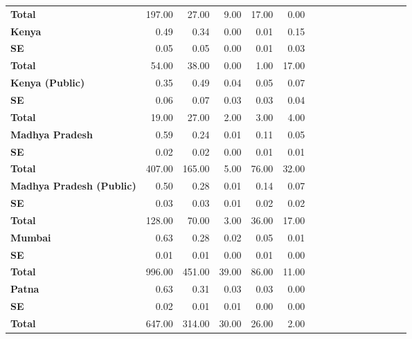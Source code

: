 \begin{tabular}{@{\extracolsep{5pt}}lrrrrrrrrrrrrrrr}
{\bf Total} & 197.00\phantom{***} & 27.00\phantom{***} & 9.00\phantom{***} & 17.00\phantom{***} & 0.00\phantom{***} \\
{\bf Kenya} & 0.49\phantom{***} & 0.34\phantom{***} & 0.00\phantom{***} & 0.01\phantom{***} & 0.15\phantom{***} \\
{\bf SE} & 0.05\phantom{***} & 0.05\phantom{***} & 0.00\phantom{***} & 0.01\phantom{***} & 0.03\phantom{***} \\
{\bf Total} & 54.00\phantom{***} & 38.00\phantom{***} & 0.00\phantom{***} & 1.00\phantom{***} & 17.00\phantom{***} \\
{\bf Kenya (Public)} & 0.35\phantom{***} & 0.49\phantom{***} & 0.04\phantom{***} & 0.05\phantom{***} & 0.07\phantom{***} \\
{\bf SE} & 0.06\phantom{***} & 0.07\phantom{***} & 0.03\phantom{***} & 0.03\phantom{***} & 0.04\phantom{***} \\
{\bf Total} & 19.00\phantom{***} & 27.00\phantom{***} & 2.00\phantom{***} & 3.00\phantom{***} & 4.00\phantom{***} \\
{\bf Madhya Pradesh} & 0.59\phantom{***} & 0.24\phantom{***} & 0.01\phantom{***} & 0.11\phantom{***} & 0.05\phantom{***} \\
{\bf SE} & 0.02\phantom{***} & 0.02\phantom{***} & 0.00\phantom{***} & 0.01\phantom{***} & 0.01\phantom{***} \\
{\bf Total} & 407.00\phantom{***} & 165.00\phantom{***} & 5.00\phantom{***} & 76.00\phantom{***} & 32.00\phantom{***} \\
{\bf Madhya Pradesh (Public)} & 0.50\phantom{***} & 0.28\phantom{***} & 0.01\phantom{***} & 0.14\phantom{***} & 0.07\phantom{***} \\
{\bf SE} & 0.03\phantom{***} & 0.03\phantom{***} & 0.01\phantom{***} & 0.02\phantom{***} & 0.02\phantom{***} \\
{\bf Total} & 128.00\phantom{***} & 70.00\phantom{***} & 3.00\phantom{***} & 36.00\phantom{***} & 17.00\phantom{***} \\
{\bf Mumbai} & 0.63\phantom{***} & 0.28\phantom{***} & 0.02\phantom{***} & 0.05\phantom{***} & 0.01\phantom{***} \\
{\bf SE} & 0.01\phantom{***} & 0.01\phantom{***} & 0.00\phantom{***} & 0.01\phantom{***} & 0.00\phantom{***} \\
{\bf Total} & 996.00\phantom{***} & 451.00\phantom{***} & 39.00\phantom{***} & 86.00\phantom{***} & 11.00\phantom{***} \\
{\bf Patna} & 0.63\phantom{***} & 0.31\phantom{***} & 0.03\phantom{***} & 0.03\phantom{***} & 0.00\phantom{***} \\
{\bf SE} & 0.02\phantom{***} & 0.01\phantom{***} & 0.01\phantom{***} & 0.00\phantom{***} & 0.00\phantom{***} \\
{\bf Total} & 647.00\phantom{***} & 314.00\phantom{***} & 30.00\phantom{***} & 26.00\phantom{***} & 2.00\phantom{***} \\
\hline
\end{tabular}
